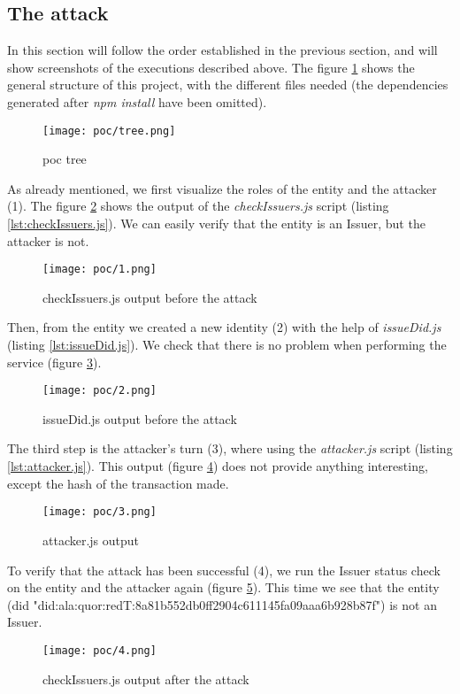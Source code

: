 \subsection{The attack}
In this section will follow the order established in the previous section, and will show screenshots of the executions described above. The figure \ref{fig:poc-tree} shows the general structure of this project, with the different files needed (the dependencies generated after \textit{npm install} have been omitted).\\
\begin{figure}[h]
    \centering
    \texttt{[image: poc/tree.png]}
    \caption{\acrshort{poc} tree}
    \label{fig:poc-tree}
\end{figure}

As already mentioned, we first visualize the roles of the entity and the attacker (1). The figure \ref{fig:poc-1} shows the output of the \textit{checkIssuers.js} script (listing \ref{lst:checkIssuers.js}). We can easily verify that the entity is an Issuer, but the attacker is not.\\
\begin{figure}[h]
    \centering
    \texttt{[image: poc/1.png]}
    \caption{checkIssuers.js output before the attack}
    \label{fig:poc-1}
\end{figure}

Then, from the entity we created a new identity (2) with the help of \textit{issueDid.js} (listing \ref{lst:issueDid.js}). We check that there is no problem when performing the service (figure \ref{fig:poc-2}).\\
\begin{figure}[h]
    \centering
    \texttt{[image: poc/2.png]}
    \caption{issueDid.js output before the attack}
    \label{fig:poc-2}
\end{figure}

The third step is the attacker's turn (3), where using the \textit{attacker.js} script (listing \ref{lst:attacker.js}). This output (figure \ref{fig:poc-3}) does not provide anything interesting, except the hash of the transaction made.\\
\begin{figure}[h]
    \centering
    \texttt{[image: poc/3.png]}
    \caption{attacker.js output}
    \label{fig:poc-3}
\end{figure}

To verify that the attack has been successful (4), we run the Issuer status check on the entity and the attacker again (figure \ref{fig:poc-4}). This time we see that the entity (\acrshort{did} "did:ala:quor:redT:8a81b552db0ff2904c611145fa09aaa6b928b87f") is not an Issuer.\\
\begin{figure}[h]
    \centering
    \texttt{[image: poc/4.png]}
    \caption{checkIssuers.js output after the attack}
    \label{fig:poc-4}
\end{figure}

